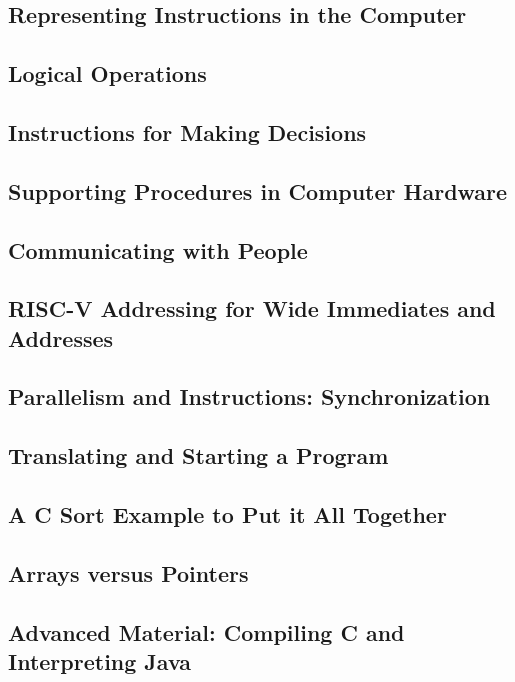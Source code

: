 \documentclass{article}
\begin{document}
{			\subsection{Representing Instructions in the Computer}
			
			\subsection{Logical Operations}
			
			\subsection{Instructions for Making Decisions}
			
			\subsection{Supporting Procedures in Computer Hardware}
			
			\subsection{Communicating with People}
			
			\subsection{RISC-V Addressing for Wide Immediates and Addresses}
			
			\subsection{Parallelism and Instructions: Synchronization}
			
			\subsection{Translating and Starting a Program}
			
			\subsection{A C Sort Example to Put it All Together}
			
			\subsection{Arrays versus Pointers}
			
			\subsection{Advanced Material: Compiling C and Interpreting Java}
			
}
\end{document}
